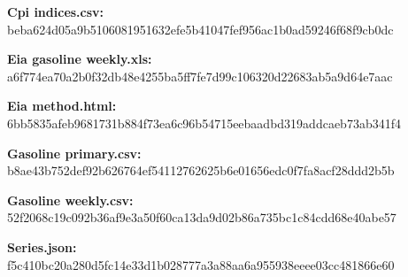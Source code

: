 \documentclass[11pt]{article}
\begin{document}
\par\noindent\textbf{Cpi indices.csv:} beba624d05a9\hspace{0pt}b51060819516\hspace{0pt}32efe5b41047\hspace{0pt}fef956ac1b0a\hspace{0pt}d59246f68f9c\hspace{0pt}b0dc

\par\noindent\textbf{Eia gasoline weekly.xls:} a6f774ea70a2\hspace{0pt}b0f32db48e42\hspace{0pt}55ba5ff7fe7d\hspace{0pt}99c106320d22\hspace{0pt}683ab5a9d64e\hspace{0pt}7aac

\par\noindent\textbf{Eia method.html:} 6bb5835afeb9\hspace{0pt}681731b884f7\hspace{0pt}3ea6c96b5471\hspace{0pt}5eebaadbd319\hspace{0pt}addcaeb73ab3\hspace{0pt}41f4

\par\noindent\textbf{Gasoline primary.csv:} b8ae43b752de\hspace{0pt}f92b626764ef\hspace{0pt}54112762625b\hspace{0pt}6e01656edc0f\hspace{0pt}7fa8acf28ddd\hspace{0pt}2b5b

\par\noindent\textbf{Gasoline weekly.csv:} 52f2068c19c0\hspace{0pt}92b36af9e3a5\hspace{0pt}0f60ca13da9d\hspace{0pt}02b86a735bc1\hspace{0pt}c84cdd68e40a\hspace{0pt}be57

\par\noindent\textbf{Series.json:} f5c410bc20a2\hspace{0pt}80d5fc14e33d\hspace{0pt}1b028777a3a8\hspace{0pt}8aa6a955938e\hspace{0pt}eee03cc48186\hspace{0pt}6e60
\end{document}
